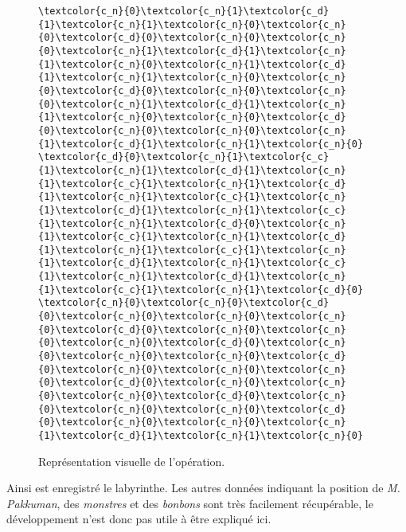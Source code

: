 \begin{figure}[!h]
\begin{BVerbatim}[commandchars=\\\{\},codes={\catcode`=3\catcode`^=7\catcode`_=8}]
\textcolor{c_n}{0}\textcolor{c_n}{1}\textcolor{c_d}{1}\textcolor{c_n}{1}\textcolor{c_n}{0}\textcolor{c_n}{0}\textcolor{c_d}{0}\textcolor{c_n}{0}\textcolor{c_n}{0}\textcolor{c_n}{1}\textcolor{c_d}{1}\textcolor{c_n}{1}\textcolor{c_n}{0}\textcolor{c_n}{1}\textcolor{c_d}{1}\textcolor{c_n}{1}\textcolor{c_n}{0}\textcolor{c_n}{0}\textcolor{c_d}{0}\textcolor{c_n}{0}\textcolor{c_n}{0}\textcolor{c_n}{1}\textcolor{c_d}{1}\textcolor{c_n}{1}\textcolor{c_n}{0}\textcolor{c_n}{0}\textcolor{c_d}{0}\textcolor{c_n}{0}\textcolor{c_n}{0}\textcolor{c_n}{1}\textcolor{c_d}{1}\textcolor{c_n}{1}\textcolor{c_n}{0}
\textcolor{c_d}{0}\textcolor{c_n}{1}\textcolor{c_c}{1}\textcolor{c_n}{1}\textcolor{c_d}{1}\textcolor{c_n}{1}\textcolor{c_c}{1}\textcolor{c_n}{1}\textcolor{c_d}{1}\textcolor{c_n}{1}\textcolor{c_c}{1}\textcolor{c_n}{1}\textcolor{c_d}{1}\textcolor{c_n}{1}\textcolor{c_c}{1}\textcolor{c_n}{1}\textcolor{c_d}{0}\textcolor{c_n}{1}\textcolor{c_c}{1}\textcolor{c_n}{1}\textcolor{c_d}{1}\textcolor{c_n}{1}\textcolor{c_c}{1}\textcolor{c_n}{1}\textcolor{c_d}{1}\textcolor{c_n}{1}\textcolor{c_c}{1}\textcolor{c_n}{1}\textcolor{c_d}{1}\textcolor{c_n}{1}\textcolor{c_c}{1}\textcolor{c_n}{1}\textcolor{c_d}{0}
\textcolor{c_n}{0}\textcolor{c_n}{0}\textcolor{c_d}{0}\textcolor{c_n}{0}\textcolor{c_n}{0}\textcolor{c_n}{0}\textcolor{c_d}{0}\textcolor{c_n}{0}\textcolor{c_n}{0}\textcolor{c_n}{0}\textcolor{c_d}{0}\textcolor{c_n}{0}\textcolor{c_n}{0}\textcolor{c_n}{0}\textcolor{c_d}{0}\textcolor{c_n}{0}\textcolor{c_n}{0}\textcolor{c_n}{0}\textcolor{c_d}{0}\textcolor{c_n}{0}\textcolor{c_n}{0}\textcolor{c_n}{0}\textcolor{c_d}{0}\textcolor{c_n}{0}\textcolor{c_n}{0}\textcolor{c_n}{0}\textcolor{c_d}{0}\textcolor{c_n}{0}\textcolor{c_n}{0}\textcolor{c_n}{1}\textcolor{c_d}{1}\textcolor{c_n}{1}\textcolor{c_n}{0}
\end{BVerbatim}
\caption{Représentation visuelle de l'opération.}
\end{figure}

Ainsi est enregistré le labyrinthe. Les autres données indiquant la position de \textit{M. Pakkuman}, des \textit{monstres} et des \textit{bonbons} sont très facilement récupérable, le développement n'est donc pas utile à être expliqué ici.